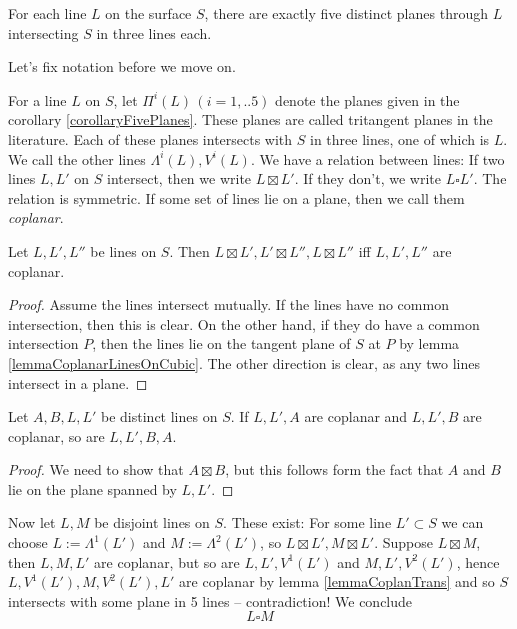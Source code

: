 \begin{corollary} \label{corollaryFivePlanes}
For each line $L$ on the surface $S$, there are exactly five distinct planes through $L$ intersecting $S$ in three lines each.
\end{corollary}

Let's fix notation before we move on.
\begin{definition}
For a line $L$ on $S$, let $\Pi^i(L) \, (i=1,..5)$ denote the planes given in the corollary \ref{corollaryFivePlanes}. These planes are called tritangent planes in the literature.
Each of these planes intersects with $S$ in three lines, one of which is $L$. We call the other lines $\Lambda^i(L), V^i(L)$.
We have a relation between lines: If two lines $L,L'$ on $S$ intersect, then we write $L \boxtimes L'$.
If they don't,  we write $L\square L'$. The relation is symmetric.
If some set of lines lie on a plane, then we call them \emph{coplanar}.
\end{definition}

\begin{lemma}
Let $L,L',L''$ be lines on $S$. Then $L\boxtimes L', L' \boxtimes L'', L\boxtimes L''$ iff $L,L',L''$ are coplanar.
\end{lemma}
\begin{proof}
Assume the lines intersect mutually.
If the lines have no common intersection, then this is clear. On the other hand, if they do have a common intersection $P$, then the lines lie on the tangent plane of $S$ at $P$ by lemma \ref{lemmaCoplanarLinesOnCubic}.
The other direction is clear, as any two lines intersect in a plane.
\end{proof}
\begin{lemma}  \label{lemmaCoplanTrans}
Let $A,B,L,L'$ be distinct lines on $S$. If $L,L',A$ are coplanar and $L,L',B$ are coplanar, so are $L,L',B,A$.
\end{lemma}
\begin{proof}
We need to show that $A \boxtimes B$, but this follows form the fact that $A$ and $B$ lie on the plane spanned by $L,L'$.
\end{proof}

Now let $L,M$ be disjoint lines on $S$.
These exist: For some line $L' \subset S$ we can choose $L := \Lambda^1(L')$ and $M := \Lambda^2(L')$, so $L \boxtimes L', M \boxtimes L'$.
Suppose $L\boxtimes M$, then $L,M,L'$ are coplanar, but so are $L,L',V^1(L')$ and $M,L',V^2(L')$, hence $L,V^1(L'),M,V^2(L'),L'$ are coplanar by lemma \ref{lemmaCoplanTrans} and so $S$ intersects with some plane in 5 lines -- contradiction!
We conclude
\begin{equation*}
L\square M
\end{equation*}

